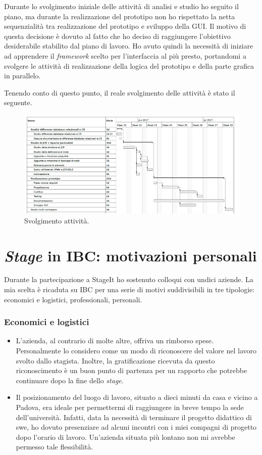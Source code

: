 		Durante lo svolgimento iniziale delle attività di analisi e studio ho seguito il piano, ma durante la realizzazione del prototipo non ho rispettato la netta sequenzialità tra realizzazione del prototipo e sviluppo della GUI. Il motivo di questa decisione è dovuto al fatto che ho deciso di raggiungere l'obiettivo desiderabile stabilito dal piano di lavoro. Ho avuto quindi la necessità di iniziare ad apprendere il \textit{framework} scelto per l'interfaccia al più presto, portandomi a svolgere le attività di realizzazione della logica del prototipo e della parte grafica in parallelo.

		Tenendo conto di questo punto, il reale svolgimento delle attività è stato il seguente.
		
		\begin{figure}[H]
			\centering
			\includegraphics[width=\textwidth]{immagini/gantt-consuntivo}
			\caption{Svolgimento attività.}
		\end{figure}
		

\section{\textit{Stage} in IBC: motivazioni personali}
	\label{sec:motivazioni_personali}
	Durante la partecipazione a StageIt ho sostenuto colloqui con undici aziende. La mia scelta è ricaduta su IBC per una serie di motivi suddivisibili in tre tipologie: economici e logistici, professionali, personali.
	
	\subsubsection*{Economici e logistici}
		\begin{itemize}
			\item L'azienda, al contrario di molte altre, offriva un rimborso spese. Personalmente lo considero come un modo di riconoscere del valore nel lavoro svolto dallo stagista. Inoltre, la gratificazione ricevuta da questo riconoscimento è un buon punto di partenza per un rapporto che potrebbe continuare dopo la fine dello \textit{stage}.
			\item Il posizionamento del luogo di lavoro, situato a dieci minuti da casa e vicino a Padova, era ideale per permettermi di raggiungere in breve tempo la sede dell'università. Infatti, data la necessità di terminare il progetto didattico di \gls{swe}, ho dovuto presenziare ad alcuni incontri con i miei compagni di progetto dopo l'orario di lavoro. Un'azienda situata più lontano non mi avrebbe permesso tale flessibilità.
		\end{itemize}
	
